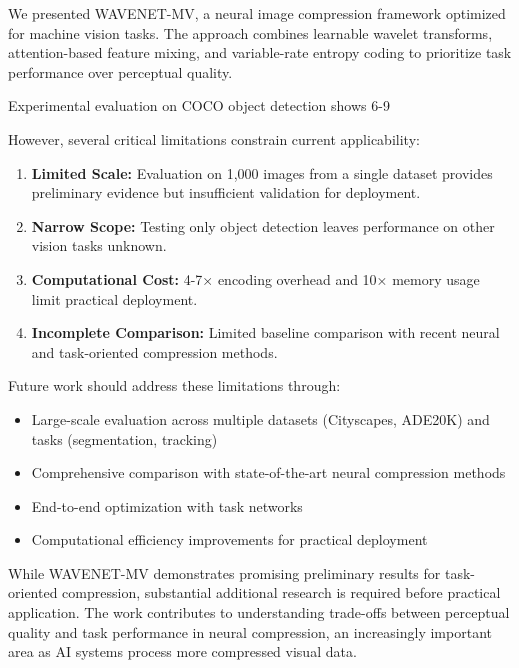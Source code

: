 We presented WAVENET-MV, a neural image compression framework optimized for machine vision tasks. The approach combines learnable wavelet transforms, attention-based feature mixing, and variable-rate entropy coding to prioritize task performance over perceptual quality.

Experimental evaluation on COCO object detection shows 6-9%

However, several critical limitations constrain current applicability:

\begin{enumerate}
\item \textbf{Limited Scale:} Evaluation on 1,000 images from a single dataset provides preliminary evidence but insufficient validation for deployment.
\item \textbf{Narrow Scope:} Testing only object detection leaves performance on other vision tasks unknown.
\item \textbf{Computational Cost:} 4-7× encoding overhead and 10× memory usage limit practical deployment.
\item \textbf{Incomplete Comparison:} Limited baseline comparison with recent neural and task-oriented compression methods.
\end{enumerate}

Future work should address these limitations through:
\begin{itemize}
\item Large-scale evaluation across multiple datasets (Cityscapes, ADE20K) and tasks (segmentation, tracking)
\item Comprehensive comparison with state-of-the-art neural compression methods
\item End-to-end optimization with task networks
\item Computational efficiency improvements for practical deployment
\end{itemize}

While WAVENET-MV demonstrates promising preliminary results for task-oriented compression, substantial additional research is required before practical application. The work contributes to understanding trade-offs between perceptual quality and task performance in neural compression, an increasingly important area as AI systems process more compressed visual data.